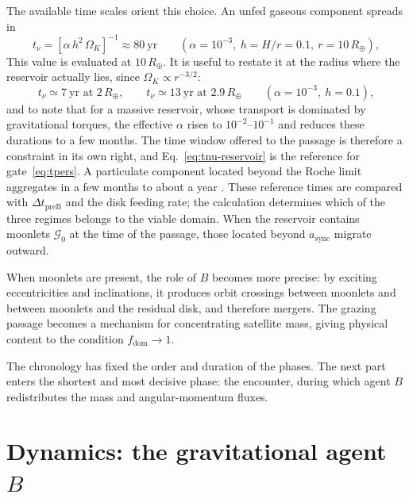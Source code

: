 \documentclass[11pt,a4paper,openany]{report}
\newcommand{\Rt}{R_{\oplus}}
\begin{document}
The available time scales orient this choice. An unfed gaseous component spreads in
\begin{equation}
t_\nu=\left[\alpha\,h^2\,\Omega_K\right]^{-1}\approx80\ \text{yr}
\qquad(\alpha=10^{-3},\ h=H/r=0.1,\ r=10\,\Rt),
\label{eq:tnu-num}
\end{equation}
This value is evaluated at $10\,\Rt$. It is useful to restate it at the radius where the reservoir
actually lies, since $\Omega_K\propto r^{-3/2}$:
\begin{equation}
t_\nu\simeq7\ \text{yr at }2\,\Rt,\qquad t_\nu\simeq13\ \text{yr at }2.9\,\Rt
\qquad(\alpha=10^{-3},\ h=0.1),
\label{eq:tnu-reservoir}
\end{equation}
and to note that for a massive reservoir, whose transport is dominated by gravitational torques,
the effective $\alpha$ rises to $10^{-2}$--$10^{-1}$ and reduces these durations to a few months.
The time window offered to the passage is therefore a constraint in its own right, and
Eq.~\eqref{eq:tnu-reservoir} is the reference for gate~\eqref{eq:tpers}.
A particulate component located beyond the Roche limit aggregates in a few months to about a year
\cite{Ida1997,Kokubo2000}. These reference times are compared with
$\Delta t_{\mathrm{preB}}$ and the disk feeding rate; the calculation determines which of the three
regimes belongs to the viable domain. When the reservoir contains moonlets $\mathcal{G}_0$ at the
time of the passage, those located beyond $a_{\mathrm{sync}}$ migrate outward.

\begin{lecture}
When moonlets are present, the role of $B$ becomes more precise: by exciting eccentricities and
inclinations, it produces orbit crossings between moonlets and between moonlets and the residual
disk, and therefore mergers. The grazing passage becomes a mechanism for concentrating satellite
mass, giving physical content to the condition $f_{\mathrm{dom}}\to1$.
\end{lecture}

\begin{rappel}
The chronology has fixed the order and duration of the phases. The next part enters the shortest
and most decisive phase: the encounter, during which agent $B$ redistributes the mass and
angular-momentum fluxes.
\end{rappel}

\part{Dynamics: the gravitational agent \texorpdfstring{$B$}{B}}
\label{part:dynamique}
\end{document}
